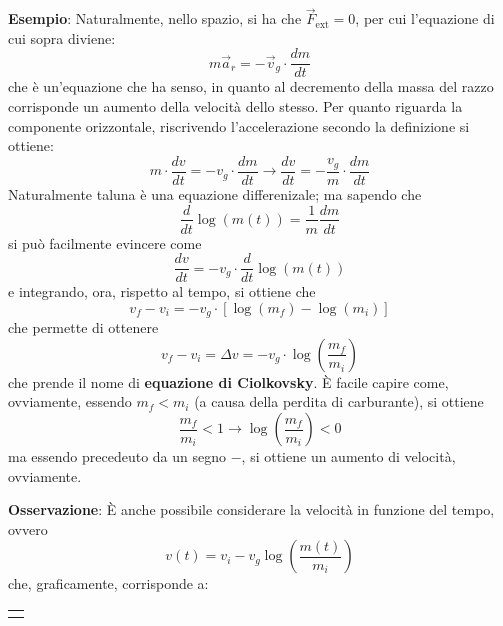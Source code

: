 \documentclass[a4paper]{extarticle}
\begin{document}
\vspace{1em}
\noindent
\textbf{Esempio}: Naturalmente, nello spazio, si ha che $\vec F_{\text{ext}}=0$, per cui l'equazione di cui sopra diviene:
\[\boxed{m \vec a_r = - \vec v_g \cdot \frac{dm}{dt}}\]
che è un'equazione che ha senso, in quanto al decremento della massa del razzo corrisponde un aumento della velocità dello stesso. Per quanto riguarda la componente orizzontale, riscrivendo l'accelerazione secondo la definizione si ottiene:
\[m \cdot \frac{dv}{dt} =- v_g \cdot \frac{dm}{dt} \longrightarrow \frac{dv}{dt} = - \frac{v_g}{m} \cdot \frac{dm}{dt}\]
Naturalmente taluna è una equazione differenizale; ma sapendo che
\[\frac{d}{dt} \log(m(t)) = \frac{1}{m} \frac{dm}{dt}\]
si può facilmente evincere come
\[\frac{dv}{dt}=-v_g \cdot \frac{d}{dt} \log(m(t))\]
e integrando, ora, rispetto al tempo, si ottiene che
\[v_f-v_i =-v_g \cdot \left[\log(m_f) - \log(m_i)\right]\]
che permette di ottenere
\[\boxed{v_f-v_i=\Delta v=-v_g \cdot \log \left(\frac{m_f}{m_i}\right)}\]
che prende il nome di \textbf{equazione di Ciolkovsky}. È facile capire come, ovviamente, essendo $m_f < m_i$ (a causa della perdita di carburante), si ottiene
\[\frac{m_f}{m_i} < 1 \longrightarrow \log \left(\frac{m_f}{m_i}\right) < 0\]
ma essendo precedeuto da un segno $-$, si ottiene un aumento di velocità, ovviamente.

\vspace{1em}
\noindent
\textbf{Osservazione}: È anche possibile considerare la velocità in funzione del tempo, ovvero
\[v(t)=v_i-v_g \log \left(\frac{m(t)}{m_i}\right)\]
che, graficamente, corrisponde a:

\vspace{2em}
\noindent
{}
\begin{tabularx}{\textwidth}{P}
  {
      \centering
  }
\end{tabularx}
\end{document}
